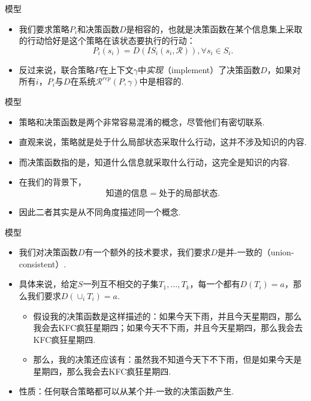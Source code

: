 \begin{frame}{模型}
\begin{itemize}
    \item 我们要求策略$P_i$和决策函数$D$是相容的，也就是决策函数在某个信息集上采取的行动恰好是这个策略在该状态要执行的行动：
    \[P_i(s_i)=D(IS_i(s_i,\mathcal R)),\forall s_i\in S_i.\]
    \item 反过来说，联合策略$P$在上下文$\gamma$中\emph{实现}（implement）了决策函数$D$，如果对所有$i$，$P_i$与$D$在系统$\mathcal R^{rep}(P,\gamma)$中是相容的.
\end{itemize}
\end{frame}

\begin{frame}{模型}
\begin{itemize}
    \item 策略和决策函数是两个非常容易混淆的概念，尽管他们有密切联系.
    \item 直观来说，策略就是处于什么局部状态采取什么行动，这并不涉及知识的内容.
    \item 而决策函数指的是，知道什么信息就采取什么行动，这完全是知识的内容.
    \item 在我们的背景下，
    \[\text{知道的信息}=\text{处于的局部状态}.\]
    \item 因此二者其实是从不同角度描述同一个概念.
\end{itemize}
\end{frame}

\begin{frame}{模型}
\begin{itemize}
    \item 我们对决策函数$D$有一个额外的技术要求，我们要求$D$是并-一致的（union-consistent）.
    \item 具体来说，给定$S$一列互不相交的子集$T_1,\dots,T_k$，每一个都有$D(T_i)=a$，那么我们要求$D(\cup_i T_i)=a$.
    \begin{itemize}
        \item 假设我的决策函数是这样描述的：如果今天下雨，并且今天星期四，那么我会去KFC疯狂星期四；如果今天不下雨，并且今天星期四，那么我会去KFC疯狂星期四.
        \item 那么，我的决策还应该有：虽然我不知道今天下不下雨，但是如果今天是星期四，那么我会去KFC疯狂星期四.
    \end{itemize}
    \item 性质：任何联合策略都可以从某个并-一致的决策函数产生.
\end{itemize}
\end{frame}

